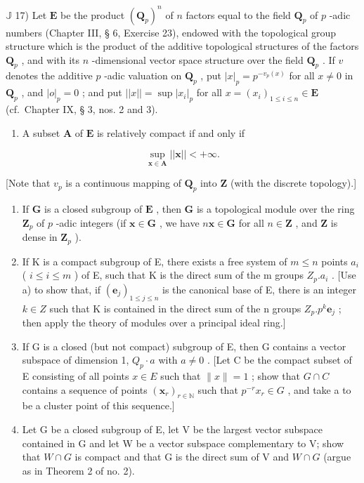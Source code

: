 \(\mathbb{J}\) 17) Let \(\mathbf{E}\) be the product \((\mathbf{Q}_p)^n\) of \(n\) factors equal to the field \(\mathbf{Q}_p\) of \(p\) -adic numbers (Chapter III, § 6, Exercise 23), endowed with the topological group structure which is the product of the additive topological structures of the factors \(\mathbf{Q}_p\) , and with its \(n\) -dimensional vector space structure over the field \(\mathbf{Q}_p\) . If \(v\) denotes the additive \(p\) -adic valuation on \(\mathbf{Q}_p\) , put \(|x|_p = p^{-v_p(x)}\) for all \(x \neq 0\) in \(\mathbf{Q}_p\) , and \(|o|_p = 0\) ; and put \(||x|| = \sup |x_i|_p\) for all \(x = (x_i)_{1 \leqslant i \leqslant n} \in \mathbf{E}\) (cf.~Chapter IX, § 3, nos. 2 and 3).

\begin{enumerate}
\def\labelenumi{\alph{enumi})}
\tightlist
\item
  A subset \(\mathbf{A}\) of \(\mathbf{E}\) is relatively compact if and only if
\end{enumerate}

\[
\sup _ {\mathbf {x} \in \mathbf {A}} | | \mathbf {x} | | <   + \infty .
\]

{[}Note that \(v_{p}\) is a continuous mapping of \(\mathbf{Q}_p\) into \(\mathbf{Z}\) (with the discrete topology).{]}

\begin{enumerate}
\def\labelenumi{\alph{enumi})}
\setcounter{enumi}{1}
\item
  If \(\mathbf{G}\) is a closed subgroup of \(\mathbf{E}\) , then \(\mathbf{G}\) is a topological module over the ring \(\mathbf{Z}_p\) of \(p\) -adic integers (if \(\boldsymbol{x} \in \mathbf{G}\) , we have \(n\boldsymbol{x} \in \mathbf{G}\) for all \(n \in \mathbf{Z}\) , and \(\mathbf{Z}\) is dense in \(\mathbf{Z}_p\) ).
\item
  If K is a compact subgroup of E, there exists a free system of \(m \leqslant n\) points \(a_{i}\) ( \(i \leqslant i \leqslant m\) ) of E, such that K is the direct sum of the m groups \(Z_{p}.a_{i}\) . {[}Use a) to show that, if \((\boldsymbol{e}_{j})_{1 \leqslant j \leqslant n}\) is the canonical base of E, there is an integer \(k \in Z\) such that K is contained in the direct sum of the n groups \(Z_{p}.p^{k}\boldsymbol{e}_{j}\) ; then apply the theory of modules over a principal ideal ring.{]}
\item
  If G is a closed (but not compact) subgroup of E, then G contains a vector subspace of dimension 1, \(Q_{p} \cdot a\) with \(a \neq 0\) . {[}Let C be the compact subset of E consisting of all points \(x \in E\) such that \(\|x\| = 1\) ; show that \(G \cap C\) contains a sequence of points \((\boldsymbol{x}_{r})_{r \in \mathbb{N}}\) such that \(p^{-r}x_{r} \in G\) , and take a to be a cluster point of this sequence.{]}
\item
  Let G be a closed subgroup of E, let V be the largest vector subspace contained in G and let W be a vector subspace complementary to V; show that \(W \cap G\) is compact and that G is the direct sum of V and \(W \cap G\) (argue as in Theorem 2 of no. 2).
\end{enumerate}

